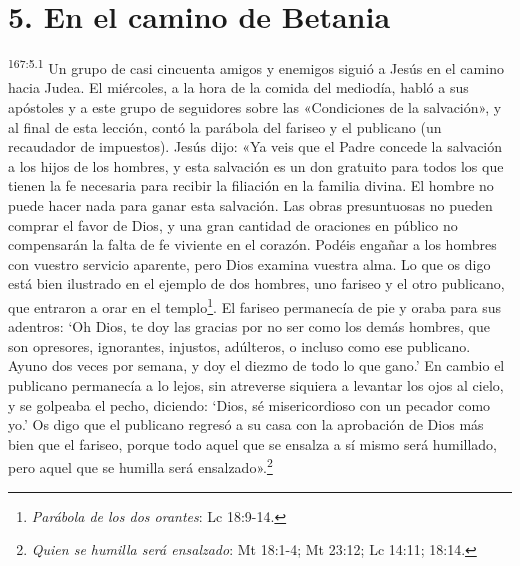 \section*{5. En el camino de Betania}
\par 
\textsuperscript{167:5.1} Un grupo de casi cincuenta amigos y enemigos siguió a Jesús en el camino hacia Judea. El miércoles, a la hora de la comida del mediodía, habló a sus apóstoles y a este grupo de seguidores sobre las «Condiciones de la salvación», y al final de esta lección, contó la parábola del fariseo y el publicano (un recaudador de impuestos). Jesús dijo: «Ya veis que el Padre concede la salvación a los hijos de los hombres, y esta salvación es un don gratuito para todos los que tienen la fe necesaria para recibir la filiación en la familia divina. El hombre no puede hacer nada para ganar esta salvación. Las obras presuntuosas no pueden comprar el favor de Dios, y una gran cantidad de oraciones en público no compensarán la falta de fe viviente en el corazón. Podéis engañar a los hombres con vuestro servicio aparente, pero Dios examina vuestra alma. Lo que os digo está bien ilustrado en el ejemplo de dos hombres, uno fariseo y el otro publicano, que entraron a orar en el templo\footnote{\textit{Parábola de los dos orantes}: Lc 18:9-14.}. El fariseo permanecía de pie y oraba para sus adentros: `Oh Dios, te doy las gracias por no ser como los demás hombres, que son opresores, ignorantes, injustos, adúlteros, o incluso como ese publicano. Ayuno dos veces por semana, y doy el diezmo de todo lo que gano.' En cambio el publicano permanecía a lo lejos, sin atreverse siquiera a levantar los ojos al cielo, y se golpeaba el pecho, diciendo: `Dios, sé misericordioso con un pecador como yo.' Os digo que el publicano regresó a su casa con la aprobación de Dios más bien que el fariseo, porque todo aquel que se ensalza a sí mismo será humillado, pero aquel que se humilla será ensalzado».\footnote{\textit{Quien se humilla será ensalzado}: Mt 18:1-4; Mt 23:12; Lc 14:11; 18:14.}

